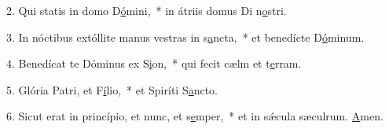 2. Qui statis in domo D\uline{ó}mini,~* in átriis domus Di n\uline{o}stri.\par 
3. In nóctibus extóllite manus vestras in s\uline{a}ncta,~* et benedícte D\uline{ó}minum.\par 
4. Benedícat te Dóminus ex S\uline{i}on,~* qui fecit cælm et t\uline{e}rram.\par 
5. Glória Patri, et F\uline{í}lio,~* et Spiríti S\uline{a}ncto.\par 
6. Sicut erat in princípio, et nunc, et s\uline{e}mper,~* et in sǽcula sæculrum. \uline{A}men.\par 
